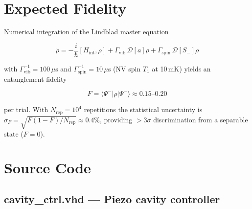 \documentclass[12pt,a4paper]{article}
\begin{document}
\section{Expected Fidelity}
\label{sec:fidelity}

Numerical integration of the Lindblad master equation

\begin{equation}
\dot{\rho} = -\frac{i}{\hbar}[H_{\mathrm{int}},\rho]
+ \Gamma_{\mathrm{vib}}\,\mathcal{D}[a]\rho
+ \Gamma_{\mathrm{spin}}\,\mathcal{D}[S_-]\rho
\label{eq:lindblad}
\end{equation}

with $\Gamma_{\mathrm{vib}}^{-1} = 100\,\mu$s and $\Gamma_{\mathrm{spin}}^{-1}
= 10\,\mu$s (NV spin $T_1$ at 10\,mK) yields an entanglement fidelity

\begin{equation}
F = \langle\Psi^-|\rho|\Psi^-\rangle \approx 0.15\text{--}0.20
\label{eq:fidelity}
\end{equation}

per trial. With $N_{\mathrm{rep}} = 10^4$ repetitions the statistical
uncertainty is $\sigma_F = \sqrt{F(1-F)/N_{\mathrm{rep}}} \approx 0.4\%$,
providing ${>}3\sigma$ discrimination from a separable state ($F = 0$).

\section{Source Code}
\label{sec:code}

\subsection*{cavity\_ctrl.vhd --- Piezo cavity controller}
\end{document}
